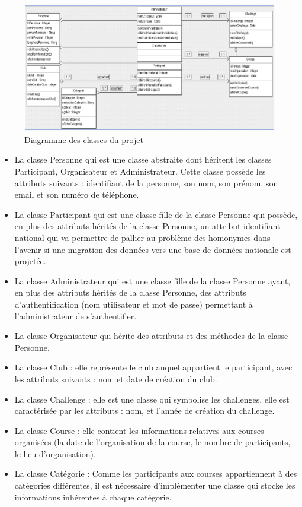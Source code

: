 \begin{figure}
	   \center
	   \includegraphics[scale=0.8]{img/Diagramme_classes.png}
	   \caption {Diagramme des classes du projet}
\end{figure}
\begin{itemize} 
 	\item La classe Personne qui est une classe abstraite dont héritent les classes Participant, Organisateur et Administrateur. Cette classe possède les attributs suivants : identifiant de la personne, son nom, son prénom, son email et son numéro de téléphone.
 	\item La classe Participant qui est une classe fille de la classe Personne qui possède, en plus des attributs hérités de la classe Personne, un attribut identifiant national qui va permettre de pallier au problème des homonymes dans l’avenir si une migration des données vers une base de données nationale est projetée.
 	\item La classe Administrateur qui est une classe fille de la classe Personne ayant, en plus des attributs hérités de la classe Personne, des attributs d’authentification (nom utilisateur et mot de passe) permettant à l’administrateur de s’authentifier. 
 	\item La classe Organisateur qui hérite des attributs et des méthodes de la classe Personne.
 	\item La classe Club : elle représente le club auquel appartient le participant, avec les attributs suivants : nom et  date de création du club.
 	\item La classe Challenge : elle est une classe qui symbolise les challenges, elle est caractérisée par les attributs : nom, et l’année de création du challenge.
 	\item La classe Course : elle contient les informations relatives aux courses organisées (la date de l’organisation de la course, le nombre de participants, le lieu d’organisation).
 	\item La classe Catégorie : Comme les participants aux courses appartiennent à des catégories différentes, il est nécessaire d’implémenter une classe qui stocke les informations inhérentes à chaque catégorie. 
\end{itemize}
